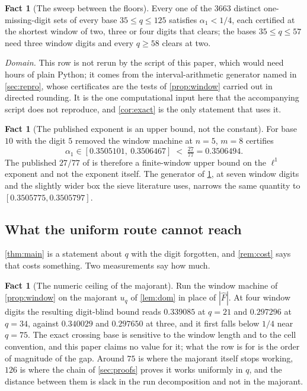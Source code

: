 \documentclass[11pt]{amsart}
\theoremstyle{definition}
\newtheorem{fact}[theorem]{Fact}
\theoremstyle{remark}
\begin{document}
\begin{fact}[The sweep between the floors]
\label{fact:sweep}
Every one of the $3663$ distinct one-missing-digit sets of every base $35 \le q \le 125$ satisfies $\alpha_{1} < 1/4$, each certified at the shortest window of two, three or four digits that clears; the bases $35 \le q \le 57$ need three window digits and every $q \ge 58$ clears at two.

\emph{Domain.} This row is not rerun by the script of this paper, which would need hours of plain Python; it comes from the interval-arithmetic generator named in \cref{sec:repro}, whose certificates are the tests of \cref{prop:window} carried out in directed rounding. It is the one computational input here that the accompanying script does not reproduce, and \cref{cor:exact} is the only statement that uses it.
\end{fact}

\begin{fact}[The published exponent is an upper bound, not the constant]
\label{fact:calib}
For base $10$ with the digit $5$ removed the window machine at $n = 5$, $m = 8$ certifies
\[
  \alpha_{1} \in [0.3505101,\ 0.3506467] \;<\; \tfrac{27}{77} = 0.3506494 .
\]
The published $27/77$ of \cite{may} is therefore a finite-window upper bound on the $\ell^{1}$ exponent and not the exponent itself. The generator of \cref{fact:sweep}, at seven window digits and the slightly wider box the sieve literature uses, narrows the same quantity to $[0.3505775, 0.3505797]$.
\end{fact}

\subsection{What the uniform route cannot reach}
\label{sub:ceiling}

\cref{thm:main} is a statement about $q$ with the digit forgotten, and \cref{rem:cost} says that costs something. Two measurements say how much.

\begin{fact}[The numeric ceiling of the majorant]
\label{fact:ceiling}
Run the window machine of \cref{prop:window} on the majorant $u_{q}$ of \cref{lem:dom} in place of $|\widehat{F}|$. At four window digits the resulting digit-blind bound reads $0.339085$ at $q = 21$ and $0.297296$ at $q = 34$, against $0.340029$ and $0.297650$ at three, and it first falls below $1/4$ near $q = 75$. The exact crossing base is sensitive to the window length and to the cell convention, and this paper claims no value for it; what the row is for is the order of magnitude of the gap. Around $75$ is where the majorant itself stops working, $126$ is where the chain of \cref{sec:proofs} proves it works uniformly in $q$, and the distance between them is slack in the run decomposition and not in the majorant.
\end{fact}
\end{document}
